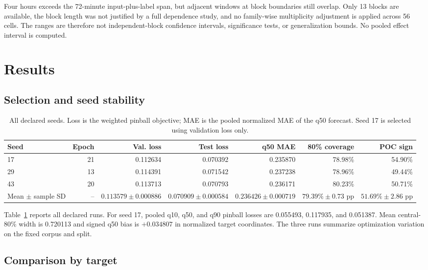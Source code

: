 \documentclass[10pt]{article}
\begin{document}
Four hours exceeds the 72-minute input-plus-label span, but adjacent windows at block boundaries still
overlap. Only 13 blocks are available, the block length was not justified by a full dependence study,
and no family-wise multiplicity adjustment is applied across 56 cells. The ranges are therefore not
independent-block confidence intervals, significance tests, or generalization bounds. No pooled
effect interval is computed.

\section{Results}

\subsection{Selection and seed stability}

\begin{table}[H]
\centering
\scriptsize
\caption{All declared seeds. Loss is the weighted pinball objective; MAE is the pooled normalized
MAE of the q50 forecast. Seed 17 is selected using validation loss only.}
\label{tab:seeds}
\begin{tabular}{@{}lrrrrrr@{}}
\toprule
Seed & Epoch & Val. loss & Test loss & q50 MAE & 80\% coverage & POC sign \\
\midrule
17 & 21 & 0.112634 & 0.070392 & 0.235870 & 78.98\% & 54.90\% \\
29 & 13 & 0.114391 & 0.071542 & 0.237238 & 78.96\% & 49.44\% \\
43 & 20 & 0.113713 & 0.070793 & 0.236171 & 80.23\% & 50.71\% \\
\midrule
Mean $\pm$ sample SD & -- & $0.113579\pm0.000886$ & $0.070909\pm0.000584$ &
$0.236426\pm0.000719$ & $79.39\%\pm0.73$ pp & $51.69\%\pm2.86$ pp \\
\bottomrule
\end{tabular}
\end{table}

Table~\ref{tab:seeds} reports all declared runs. For seed 17, pooled q10, q50, and q90 pinball losses
are 0.055493, 0.117935, and 0.051387. Mean
central-80\% width is 0.720113 and signed q50 bias is $+0.034807$ in normalized target coordinates.
The three runs summarize optimization variation on the fixed corpus and split.

\subsection{Comparison by target}
\end{document}
